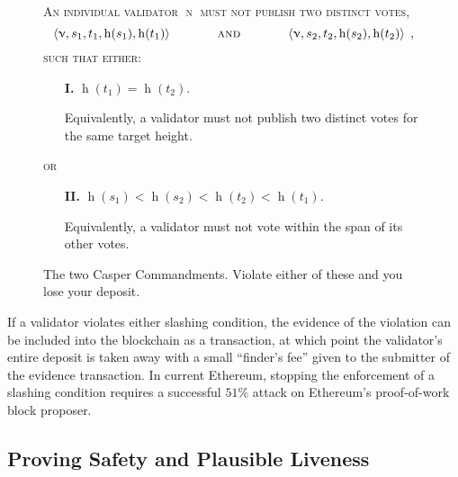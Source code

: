\documentclass[12pt]{article}
\newcommand{\h}{\operatorname{h}\xspace}
\begin{document}

\begin{figure}
\begin{mdframed}
\textsc{An individual validator $\upnu$ must not publish two distinct votes,}
\begin{equation*}
\left\langle \upnu, s_1, t_1, \h(s_1), \h(t_1)\right\rangle \hspace{0.5in} \textsc{and} \hspace{0.5in} \left\langle \upnu, s_2, t_2, \h(s_2), \h(t_2)\right\rangle \; ,
\end{equation*}
\textsc{such that either:}

\begin{enumerate}
   \item[\textbf{I.}] $\h(t_1) = \h(t_2)$.

   Equivalently, a validator must not publish two distinct votes for the same target height.
\end{enumerate}
\vspace{-0.15in}
\textsc{or}

\begin{enumerate}
   \item[\textbf{II.}] $\h(s_1) < \h(s_2) < \h(t_2) < \h(t_1)$.

   Equivalently, a validator must not vote within the span of its other votes.
\end{enumerate}
\end{mdframed}
\caption{The two Casper Commandments.  Violate either of these and you lose your deposit.}
\label{fig:commandments}
\end{figure}


If a validator violates either slashing condition, the evidence of the violation can be included into the blockchain as a transaction, at which point the validator's entire deposit is taken away with a small ``finder's fee'' given to the submitter of the evidence transaction. In current Ethereum, stopping the enforcement of a slashing condition requires a successful $51\%$ attack on Ethereum's proof-of-work block proposer.





\subsection{Proving Safety and Plausible Liveness}
\label{sect:theorems}
\end{document}
